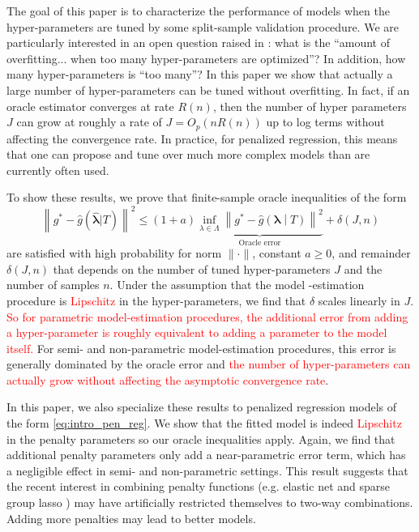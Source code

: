 \documentclass[12pt]{article} %
\theoremstyle{definition}
\newcommand{\textred}[1]{\textcolor{red}{#1}}
\begin{document}
The goal of this paper is to characterize the performance of models when the hyper-parameters are tuned by some split-sample validation procedure. We are particularly interested in an open question raised in \citet{bengio2000gradient}: what is the ``amount of overfitting... when too many hyper-parameters are optimized''? In addition, how many hyper-parameters is ``too many''? In this paper we show that actually a large number of hyper-parameters can be tuned without overfitting. In fact, if an oracle estimator converges at rate $R(n)$, then the number of hyper parameters $J$ can grow at roughly a rate of $J = O_p(nR(n))$ up to log terms without affecting the convergence rate. In practice, for penalized regression, this means that one can propose and tune over much more complex models than are currently often used.

To show these results, we prove that finite-sample oracle inequalities of the form
\begin{equation}
\label{thrm:intro_oracle_ineq}
\left \| g^* - \hat{g} (\hat{\boldsymbol{\lambda}} | T ) \right \|^2
\le
(1+a)
\underbrace{\inf_{\lambda \in \Lambda} \left \| g^* - \hat{g}\left (\boldsymbol{\lambda} \middle | T \right ) \right \|^2}_{\text{Oracle error}}
+ \delta \left(J,n\right)
\end{equation}
are satisfied with high probability for norm $\| \cdot \|$, constant $a \ge 0$, and remainder $\delta(J,n)$ that depends on the number of tuned hyper-parameters $J$ and the number of samples $n$.
Under the assumption that the model -estimation procedure is \textred{Lipschitz} in the hyper-parameters, we find that $\delta$ scales linearly in $J$.
\textred{So for parametric model-estimation procedures, the additional error from adding a hyper-parameter is roughly equivalent to adding a parameter to the model itself.}
For semi- and non-parametric model-estimation procedures, this error is generally dominated by the oracle error and \textred{the number of hyper-parameters can actually grow without affecting the asymptotic convergence rate}.

In this paper, we also specialize these results to penalized regression models of the form \eqref{eq:intro_pen_reg}. We show that the fitted model is indeed \textred{Lipschitz} in the penalty parameters so our oracle inequalities apply. Again, we find that additional penalty parameters only add a near-parametric error term, which has a negligible effect in semi- and non-parametric settings. This result suggests that the recent interest in combining penalty functions (e.g. elastic net and sparse group lasso \citep{zou2003regression, simon2013sparse}) may have artificially restricted themselves to two-way combinations. Adding more penalties may lead to better models.
\end{document}
